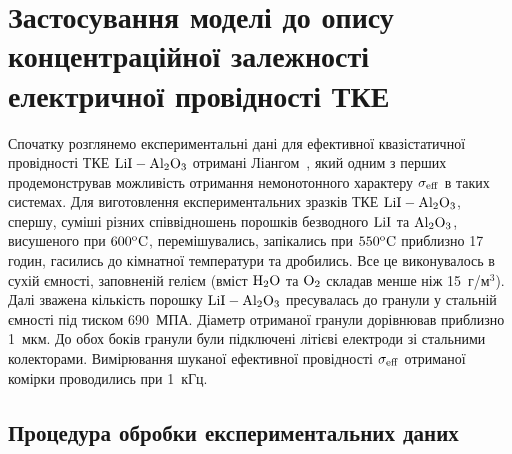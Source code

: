 \documentclass[14pt,twoside]{vakthesis}
\begin{document}
\section{Застосування моделі до опису концентраційної залежності  електричної провідності ТКЕ}\label{sec:CSE}

Спочатку розглянемо експериментальні дані для ефективної квазістатичної провідності ТКЕ $\rm LiI-Al_2O_3$ отримані  Ліангом~\cite{Liang1973}, який одним з перших продемонстрував можливість отримання немонотонного характеру $\sigma_{\rm eff}$ в таких системах.
Для виготовлення експериментальних зразків ТКЕ $\rm LiI-Al_2O_3$, спершу, суміші різних співвідношень порошків безводного $\rm LiI$ та $\rm Al_2O_3$, висушеного при $\rm 600^{o}C$, перемішувались, запікались при $\rm 550^{o}C$ приблизно 17 годин, гасились до кімнатної температури та дробились. Все це виконувалось в сухій ємності, заповненій гелієм (вміст $\rm H_2O$ та $\rm O_2$ складав менше ніж 15~г/м$^3$). Далі зважена кількість порошку $\rm LiI-Al_2O_3$ пресувалась до гранули у стальній ємності під тиском 690~МПА. Діаметр отриманої гранули дорівнював приблизно 1~мкм. До обох боків гранули були підключені літієві електроди зі стальними колекторами. Вимірювання шуканої ефективної провідності $\sigma_{\rm eff}$ отриманої комірки проводились при 1~кГц. 


\subsection{Процедура обробки експериментальних даних}
\end{document}
